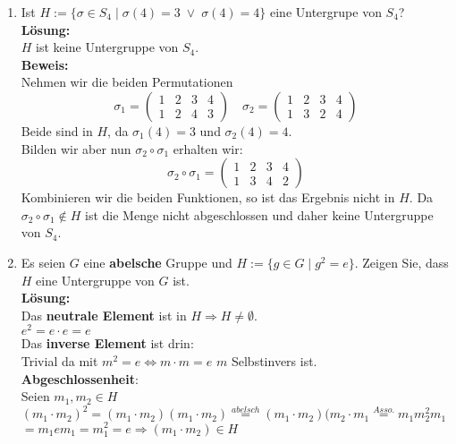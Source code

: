 \documentclass[11pt,a4paper,ngerman]{article}
\begin{document}
\begin{enumerate}[\bfseries a)]

\item Ist $H := \{ \sigma \in S_4 \; | \; \sigma (4) = 3  \; \lor \; \sigma (4) = 4 \}$ eine Untergrupe von $S_4$?\\

\textbf{Lösung:}\\

$H$ ist keine Untergruppe von $S_4$.\\
\textbf{Beweis:}\\

Nehmen wir die beiden Permutationen
$$
\sigma_1 = \begin{pmatrix} 1 & 2 & 3 & 4 \\ 1 & 2 & 4 & 3 \end{pmatrix} \quad  \sigma_2 = \begin{pmatrix} 1 & 2 & 3 & 4 \\ 1 & 3 & 2 & 4 \end{pmatrix}
$$
Beide sind in $H$, da $\sigma_1 (4) = 3$ und $\sigma_2 (4) = 4$.\\
Bilden wir aber nun $\sigma_2 \circ \sigma_1$ erhalten wir:
$$
\sigma_2 \circ \sigma_1 =  \begin{pmatrix} 1 & 2 & 3 & 4 \\ 1 & 3 & 4 & 2 \end{pmatrix}
$$
Kombinieren wir die beiden Funktionen, so ist das Ergebnis nicht in $H$. Da $\sigma_2 \circ \sigma_1 \not \in H$ ist die Menge nicht abgeschlossen und daher keine Untergruppe von $S_4$.
\item Es seien $G$ eine \textbf{abelsche} Gruppe und $H := \{ g \in G \; | \; g^2 = e \}$. Zeigen Sie, dass $H$ eine Untergruppe von $G$ ist.\\

\textbf{Lösung:}\\


Das \textbf{neutrale Element} ist in $H \Rightarrow H \not= \emptyset$.\\
$e^2 = e \cdot e = e$\\

Das \textbf{inverse Element} ist drin:\\
Trivial da mit $m^2 = e \Leftrightarrow m \cdot m = e$ $m$ Selbstinvers ist.\\

\textbf{Abgeschlossenheit}:\\
Seien $m_1,m_2 \in H$\\
$(m_1 \cdot m_2)^2 = (m_1 \cdot m_2) (m_1 \cdot m_2) \stackrel{abelsch}{=} (m_1 \cdot m_2) (m_2 \cdot m_1 \stackrel{Asso.}{=} m_1 m_2^2 m_1$\\
$= m_1 e m_1 = m_1^2 = e \Rightarrow (m_1 \cdot m_2) \in H$


\end{enumerate}
\end{document}
